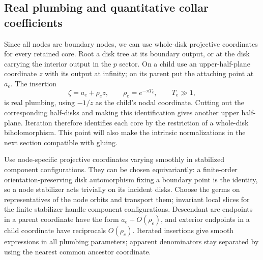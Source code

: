 \subsection{Real plumbing and quantitative collar coefficients}

Since all nodes are boundary nodes, we can use whole-disk projective
coordinates for every retained core.  Root a disk tree at its boundary
output, or at the disk carrying the interior output in the $p$ sector.
On a child use an upper-half-plane coordinate $z$ with its output at
infinity; on its parent put the attaching point at $a_e$.  The insertion
\begin{equation}\label{local:plumbing}
 \zeta=a_e+\rho_e z,\qquad \rho_e=e^{-\pi T_e},\qquad T_e\gg1,
\end{equation}
is real plumbing, using $-1/z$ as the child's nodal coordinate.  Cutting
out the corresponding half-disks and making this identification gives
another upper half-plane.  Iteration therefore identifies each core by
the restriction of a whole-disk biholomorphism.  This point will also
make the intrinsic normalizations in the next section compatible with
gluing.

Use node-specific projective coordinates varying smoothly in stabilized
component configurations.  They can be chosen equivariantly: a finite-order
orientation-preserving disk automorphism fixing a boundary point is the
identity, so a node stabilizer acts trivially on its incident disks.
Choose the germs on representatives of the node orbits and transport
them; invariant local slices for the finite stabilizer handle component
configurations.  Descendant arc endpoints in a parent coordinate have
the form $a_e+O(\rho_e)$, and exterior endpoints in a child coordinate
have reciprocals $O(\rho_e)$.  Iterated insertions give smooth expressions
in all plumbing parameters; apparent denominators stay separated by
using the nearest common ancestor coordinate.

